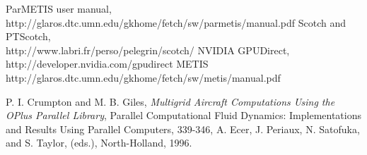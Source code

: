 \documentclass[11pt]{article}
\begin{document}
\begin{thebibliography}{4}
 ParMETIS user manual,\\http://glaros.dtc.umn.edu/gkhome/fetch/sw/parmetis/manual.pdf
 Scotch and PTScotch,\\http://www.labri.fr/perso/pelegrin/scotch/
 NVIDIA GPUDirect, \\http://developer.nvidia.com/gpudirect
 METIS \\http://glaros.dtc.umn.edu/gkhome/fetch/sw/metis/manual.pdf

 P. I. Crumpton and M. B. Giles, \textit{Multigrid {A}ircraft {C}omputations {U}sing the {OP}lus
{P}arallel {L}ibrary}, Parallel Computational Fluid Dynamics: Implementations and Results Using Parallel
Computers, 339-346, {A}. Ecer, J. Periaux, N. Satofuka, and S. Taylor, (eds.), North-Holland, 1996.

\end{thebibliography}
\end{document}
